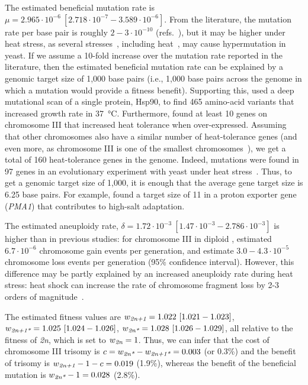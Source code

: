 \documentclass[12pt]{extarticle}
\newcommand{\euwt}{\emph{2n}}
\newcommand{\anwt}{\emph{2n+1}}
\newcommand{\eumt}{\emph{2n*}}
\newcommand{\anmt}{\emph{2n+1*}}
\begin{document}
The estimated beneficial mutation rate is $\mu=2.965\cdot10^{-6}\ [2.718\cdot10^{-7}-3.589\cdot10^{-6}]$. From the literature, the mutation rate per base pair is roughly $2-3\cdot10^{-10}$ (refs.~\citep{Zhu2014,Lynch2008}), but it may be higher under heat stress, as several stresses~\citep{Heidenreich2007}, including heat~\citep{Huang2018}, may cause hypermutation in yeast.
If we assume a 10-fold increase over the mutation rate reported in the literature, then the estimated beneficial mutation rate can be explained by a genomic target size of 1,000 base pairs (i.e., 1,000 base pairs across the genome in which a mutation would provide a fitness benefit).
Supporting this, \citet{Flynn2020} used a deep mutational scan of a single protein, Hsp90, to find 465 amino-acid variants that increased growth rate in \SI{37}{\celsius}.
Furthermore, \citet{Yona2012} found at least 10 genes on chromosome III that increased heat tolerance when over-expressed. Assuming that other chromosomes also have a similar number of heat-tolerance genes (and even more, as chromosome III is one of the smallest chromosomes~\citep{Gilchrist2019}), we get a total of 160 heat-tolerance genes in the genome.
Indeed, mutations were found in 97 genes in an evolutionary experiment with yeast under heat stress~\citep{Huang2018}.
Thus, to get a genomic target size of 1,000, it is enough that the average gene target size is 6.25 base pairs. For example, \citet{Kohn2014} found a target size of 11 in a proton exporter gene (\emph{PMA1}) that contributes to high-salt adaptation.

The estimated aneuploidy rate, $\delta=1.72\cdot10^{-3}\ [1.47\cdot10^{-3}-2.786\cdot10^{-3}]$ is higher than in previous studies: for chromosome III in diploid \yeast, \citet{Zhu2014} estimated $6.7\cdot10^{-6}$ chromosome gain events per generation, and \citet{Kumaran2013} estimate $3.0-4.3\cdot10^{-5}$ chromosome loss events per generation (95\% confidence interval). 
However, this difference may be partly explained by an increased aneuploidy rate during heat stress: heat shock can increase the rate of chromosome fragment loss by 2-3 orders of magnitude~\citep{Chen2012a}.

The estimated fitness values are $w_{\anwt}=1.022\ [1.021-1.023]$,
$w_{\anmt}=1.025\ [1.024-1.026]$,
$w_{\eumt}=1.028\ [1.026-1.029]$, all relative to the fitness of \euwt, which is set to $w_{\euwt}=1$. 
Thus, we can infer that the cost of chromosome III trisomy is $c = w_{\eumt}-w_{\anmt} = 0.003$ (or 0.3\%) and the benefit of trisomy is $w_{\anwt}-1-c=0.019$ (1.9\%), whereas the benefit of the beneficial mutation is $w_{\eumt}-1=0.028$ (2.8\%).
\end{document}
